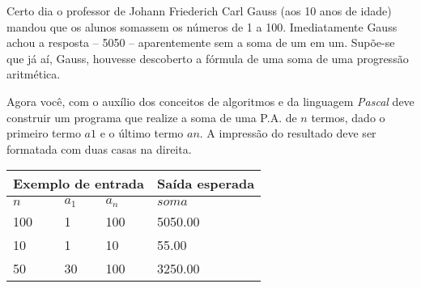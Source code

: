 \item Certo dia o professor de Johann Friederich Carl Gauss (aos 10 anos de
idade) mandou que os alunos somassem os números de 1 a 100. Imediatamente
Gauss achou a resposta – 5050 – aparentemente sem a soma de um em um.
Supõe-se que já aí, Gauss, houvesse descoberto a fórmula de uma soma de uma
progressão aritmética.

Agora você, com o auxílio dos conceitos de algoritmos e da linguagem
\emph{Pascal} deve construir um programa que realize a soma de uma P.A.
de $n$ termos, dado o primeiro termo $a1$ e o último termo $an$.
A impressão do resultado deve ser formatada com duas casas na direita.

\begin{center}
\begin{tabular}{|l|l|l|l|} \hline
\multicolumn{3}{|c|}{Exemplo de entrada} & Saída esperada \\ \hline
$n$ & $a_1$ & $a_n$   & $soma$               \\ \hline
100 & 1 & 100         & 5050.00                \\ \hline
10 & 1 & 10          & 55.00             \\ \hline
50 & 30 & 100         & 3250.00          \\ \hline
\end{tabular}
\end{center}
